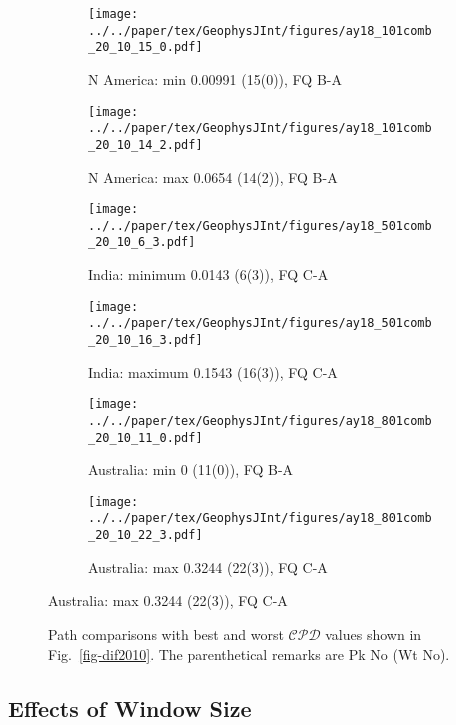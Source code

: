 \begin{figure}[tbp]
  \centering
  \vspace{-.2cm}
  \begin{subfigure}{.43\textwidth}
    \texttt{[image: ../../paper/tex/GeophysJInt/figures/ay18\_101comb\_20\_10\_15\_0.pdf]}
    \caption{N America: min 0.00991 (15(0)), FQ B-A}
  \end{subfigure}
  \begin{subfigure}{.43\textwidth}
    \texttt{[image: ../../paper/tex/GeophysJInt/figures/ay18\_101comb\_20\_10\_14\_2.pdf]}
    \caption{N America: max 0.0654 (14(2)), FQ B-A}
  \end{subfigure}
  \vspace{.1em}
  \begin{subfigure}{.43\textwidth}
    \texttt{[image: ../../paper/tex/GeophysJInt/figures/ay18\_501comb\_20\_10\_6\_3.pdf]}
    \caption{India: minimum 0.0143 (6(3)), FQ C-A}
  \end{subfigure}
  \begin{subfigure}{.43\textwidth}
    \texttt{[image: ../../paper/tex/GeophysJInt/figures/ay18\_501comb\_20\_10\_16\_3.pdf]}
    \caption{India: maximum 0.1543 (16(3)), FQ C-A}
  \end{subfigure}
  \vspace{.1em}
  \begin{subfigure}{.43\textwidth}
    \texttt{[image: ../../paper/tex/GeophysJInt/figures/ay18\_801comb\_20\_10\_11\_0.pdf]}
    \caption{Australia: min 0 (11(0)), FQ B-A}\label{fig-au-2010110}
  \end{subfigure}
  \begin{subfigure}{.43\textwidth}
    \texttt{[image: ../../paper/tex/GeophysJInt/figures/ay18\_801comb\_20\_10\_22\_3.pdf]}
    \caption{Australia: max 0.3244 (22(3)), FQ C-A}\label{fig-au-2010223}
  \end{subfigure}
\end{figure}
\begin{figure}[!ht]
  \ContinuedFloat\caption[Best and worst $\mathcal{CPD}$s (20/10 Myr window/step)]{Path
    comparisons with best and worst $\mathcal{CPD}$ values shown in
    Fig.~\ref{fig-dif2010}. The parenthetical remarks are Pk No (Wt
    No).}\label{fig-dif2010bw}
\end{figure}

\subsection{Effects of Window Size}\label{sec:winsiz}

